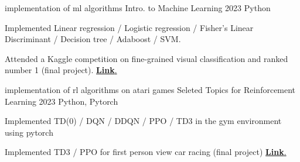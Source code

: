 

\begin{cventries}

  \cventry
      {implementation of ml algorithms} 
      {Intro. to Machine Learning} 
      {2023} 
      {Python}
      {
        \begin{cvitems} %
          \item {Implemented Linear regression / Logistic regression / Fisher's Linear Discriminant / Decision tree / Adaboost / SVM. }
          \item{
          Attended a Kaggle competition on fine-grained visual classification and ranked number 1 (final project).} \href{https://github.com/stanleyshen2003/Intro.-to-ML}{\textbf{Link}.}
        \end{cvitems}
      }



  \cventry
    {implementation of rl algorithms on atari games} 
    {Seleted Topics for Reinforcement Learning} 
    {2023} 
    {Python, Pytorch} 
    {
      \begin{cvitems} %
        \item {Implemented TD(0) / DQN / DDQN / PPO / TD3 in the gym environment using pytorch}
        \item {
        Implemented TD3 / PPO for first person view car racing (final project) \href{https://github.com/stanleyshen2003/selected-topics-for-Reinforcement-learning}{\textbf{Link}.}
        }
      \end{cvitems}
    }




\end{cventries}



